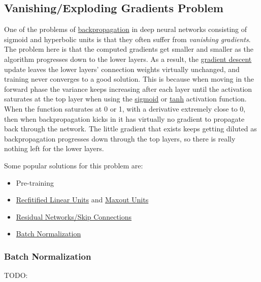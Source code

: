 \documentclass[12pt]{article}
\begin{document}
    \subsection{Vanishing/Exploding Gradients Problem} \label{sec:VanishingProblem}
        One of the problems of \hyperref[sec:Backprop]{backpropagation} in deep neural networks consisting of sigmoid
        and hyperbolic units is that they often suffer from \textit{vanishing gradients}. The problem here is that the
        computed gradients get smaller and smaller as the algorithm progresses down to the lower layers. As a result,
        the \hyperref[sec:GD]{gradient descent} update leaves the lower layers' connection weights virtually unchanged,
        and training never converges to a good solution. This is because when moving in the forward phase the
        variance keeps increasing after each layer until the activation saturates at the top layer when using the
        \hyperref[sec:Sigmoid]{sigmoid} or \hyperref[sec:Tanh]{tanh} activation function. When the function
        saturates at 0 or 1, with a derivative extremely close to 0, then when backpropagation kicks in it has
        virtually no gradient to propagate back through the network. The little gradient that exists keeps getting
        diluted as backpropagation progresses down through the top layers, so there is really nothing left for the
        lower layers.
        
        Some popular solutions for this problem are:
        \begin{itemize}
            \item Pre-training
            \item \hyperref[sec:reLU]{Recfitified Linear Units} and \hyperref[sec:MaxoutUnits]{Maxout Units}
            \item \hyperref[sec:ResNet]{Residual Networks/Skip Connections}
            \item \hyperref[sec:BatchNormalization]{Batch Normalization}
        \end{itemize}

        \subsubsection{Batch Normalization} \label{sec:BatchNormalization}
            TODO:
\end{document}
